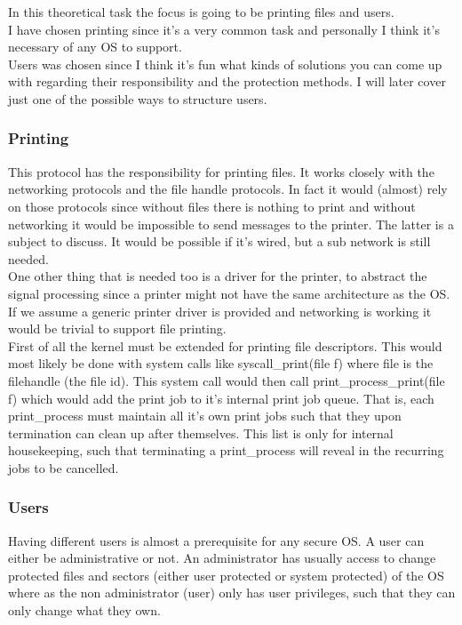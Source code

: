 \documentclass[12pt]{article}
\begin{document}
In this theoretical task the focus is going to be printing files and users. \\

I have chosen printing since it's a very common task and personally I think it's necessary of any OS to support.\\

Users was chosen since I think it's fun what kinds of solutions you can come up with regarding their responsibility and the protection methods. I will later cover just one of the possible ways to structure users.  

\subsubsection{Printing}

This protocol has the responsibility for printing files. It works closely with the networking protocols and the file handle protocols. In fact it would (almost) rely on those protocols since without files there is nothing to print and without networking it would be impossible to send messages to the printer. The latter is a subject to discuss. It would be possible if it's wired, but a sub network is still needed.\\

One other thing that is needed too is a driver for the printer, to abstract the signal processing since a printer might not have the same architecture as the OS. If we assume a generic printer driver is provided and networking is working it would be trivial to support file printing.\\

First of all the kernel must be extended for printing file descriptors. This would most likely be done with system calls like syscall\_print(file f) where file is the filehandle (the file id). This system call would then call print\_process\_print(file f) which would add the print job to it's internal print job queue. That is, each print\_process must maintain all it's own print jobs such that they upon termination can clean up after themselves. This list is only for internal housekeeping, such that terminating a print\_process will reveal in the recurring jobs to be cancelled.\\

\subsubsection{Users}

Having different users is almost a prerequisite for any secure OS. A user can either be administrative or not. An administrator has usually access to change protected files and sectors (either user protected or system protected) of the OS where as the non administrator (user) only has user privileges, such that they can only change what they own. \\
\end{document}
